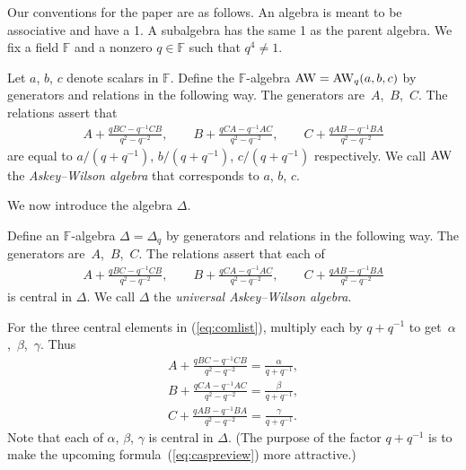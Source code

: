 Our conventions for the paper are as follows.
An algebra is meant to be associative and have a 1.
A subalgebra has the same 1 as the parent algebra.
We f\/ix a f\/ield $\mathbb F$
and  a nonzero $q \in \mathbb F$ such that $q^4\not=1$.

\begin{Definition}
\label{def:aw3}
Let $a$, $b$, $c$ denote scalars in $\mathbb F$.
Def\/ine the $\mathbb F$-algebra ${\rm AW}={\rm AW}_q(a,b,c)$
 by generators and relations in the following way.
The generators are~$A$,~$B$,~$C$.
The relations assert that
\begin{gather*}
 A+ \frac{qBC-q^{-1}CB}{q^2-q^{-2}},
\qquad B+
\frac{qCA-q^{-1}AC}{q^2-q^{-2}},
\qquad
C+
\frac{qAB-q^{-1}BA}{q^2-q^{-2}}
\end{gather*}
are equal to
$
a/(q+q^{-1})$,
$b/(q+q^{-1})$,
$c /(q+q^{-1})$
respectively. We call ${\rm AW}$ the
{\it Askey--Wilson algebra} that corresponds to
$a$, $b$, $c$.
\end{Definition}

 We now introduce the algebra $\Delta$.

\begin{Definition}
\label{def:uaw}
Def\/ine an $\mathbb F$-algebra
$\Delta=\Delta_q$
 by generators and relations in the following way.
The generators are~$A$,~$B$,~$C$.
The relations assert that each of
\begin{gather}
 A+ \frac{qBC-q^{-1}CB}{q^2-q^{-2}},
\qquad B+
\frac{qCA-q^{-1}AC}{q^2-q^{-2}},
\qquad
C+
\frac{qAB-q^{-1}BA}{q^2-q^{-2}}
\label{eq:comlist}
\end{gather}
is central in $\Delta$.
We call $\Delta$ the {\it universal Askey--Wilson algebra}.
\end{Definition}





\begin{Definition}
\label{def:abc}
\rm
For the
three central elements in
(\ref{eq:comlist}), multiply each by $q+q^{-1}$ to get~$\alpha$,~$\beta$,~$\gamma$. Thus
\begin{gather}
A+ \frac{qBC-q^{-1}CB}{q^2-q^{-2}}
=
\frac{\alpha}{q+q^{-1}},
\label{eq:u1}
\\
B+
\frac{qCA-q^{-1}AC}{q^2-q^{-2}}
=
\frac{\beta}{q+q^{-1}},
\label{eq:u2}
\\
C+
\frac{qAB-q^{-1}BA}{q^2-q^{-2}}
=
\frac{\gamma}{q+q^{-1}}.
\label{eq:u3}
\end{gather}
Note that each of $\alpha$, $\beta$, $\gamma$ is central in
$\Delta$.
(The purpose of the factor $q+q^{-1}$ is
to make the upcoming formula~(\ref{eq:caspreview})
more attractive.)
\end{Definition}
